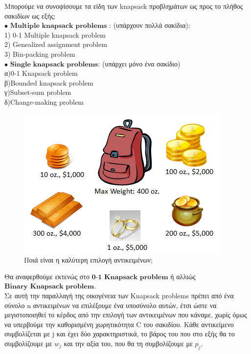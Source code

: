 \documentclass[12pt]{article}
\begin{document}
Μπορούμε να συνοψίσουμε τα είδη των knapsack προβλημάτων ως προς το πλήθος σακιδίων ως εξής: \\
 \(\bullet\) \(\textbf{Multiple knapsack problems}\) : (υπάρχουν πολλά σακίδια): \\
 1) 0-1 Multiple knapsack problem \\
 2) Genealized assignment problem \\
 3) Bin-packing problem \\
 \(\bullet\) \(\textbf{Single knapsack problems}\): (υπάρχει μόνο ένα σακίδιο) \\
 α)0-1 Knapsack problem \\
 β)Bounded   knapsack   problem \\
 γ)Subset-sum   problem \\
 δ)Change-making problem \\

\begin{figure}
	\centering
	\includegraphics[scale=0.7]{./figures/knapsack_problem.png}
	\caption{Ποιά είναι η καλύτερη επιλογή αντικειμένων;}
\end{figure}

Θα αναφερθούμε εκτενώς στο \(\textbf{0-1 Knapsack problem}\)  ή αλλιώς \(\textbf{Binary Knapsack problem}\). \\

Σε αυτή την παραλλαγή της οικογένεια των Knapsack problems πρέπει από ένα σύνολο n αντικειμένων να επιλέξουμε ένα υποσύνολο αυτών, έτσι ώστε να μεγιστοποιηθεί το κέρδος από την επιλογή των αντικειμένων που κάναμε, χωρίς όμως να υπερβούμε την καθορισμένη χωρητικότητα C του σακιδίου. Κάθε αντικείμενο συμβολίζεται με j και έχει δύο χαρακτηριστικά, το βάρος του που στο εξής θα το συμβολίζουμε με \(w_{j}\) και την αξία του, που θα τη συμβολίζουμε με \(p_{j}\). \\
\end{document}
